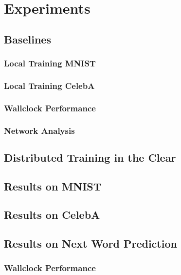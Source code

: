 \chapter{Experiments}
\label{chapter:body}
\thispagestyle{myheadings}

\graphicspath{{2_Body/Figures/}}

\section{Baselines}
\subsection{Local Training MNIST}
\subsection{Local Training CelebA}
\subsection{Wallclock Performance}
\subsection{Network Analysis}

\section{Distributed Training in the Clear}
\section{Results on MNIST}
\section{Results on CelebA}
\section{Results on Next Word Prediction}
\subsection{Wallclock Performance}
